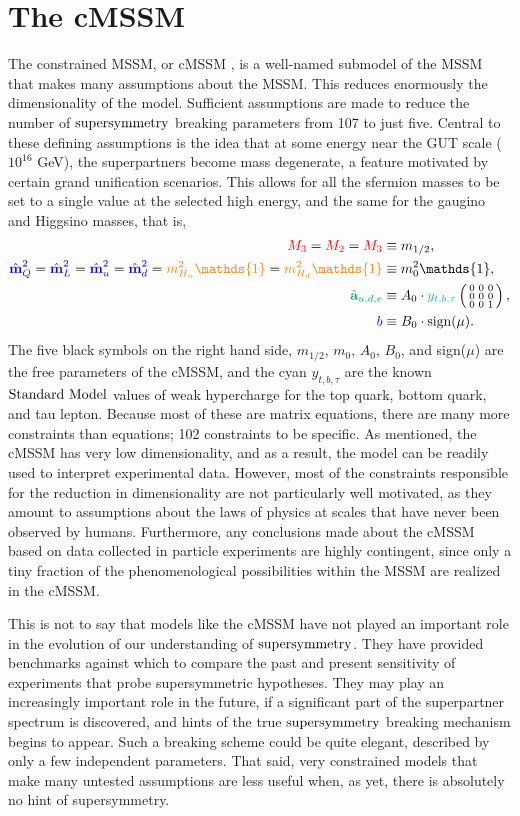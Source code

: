 \section{The cMSSM}
The constrained MSSM, or cMSSM \cite{Wess:1984jr}, is a well-named submodel of the MSSM that makes many assumptions about the MSSM. This reduces enormously the dimensionality of the model. Sufficient assumptions are made to reduce the number of $\text{supersymmetry}$ breaking parameters from 107 to just five. Central to these defining assumptions is the idea that at some energy near the GUT scale ($10^{16}$ GeV), the superpartners become mass degenerate, a feature motivated by certain grand unification scenarios. This allows for all the sfermion masses to be set to a single value at the selected high energy, and the same for the gaugino and Higgsino masses, that is,
\begin{align}
{\color{red}M_3}={\color{red}M_2}={\color{red}M_3} & \equiv m_{1/2},\\
{\color{blue}\hat{\textbf{m}}_Q^2}={\color{blue}\hat{\textbf{m}}_L^2}={\color{blue}\hat{\textbf{m}}_u^2}={\color{blue}\hat{\textbf{m}}_d^2} ={\color{orange}m_{H_u}^2\mathds{1}}={\color{orange}m_{H_d}^2\mathds{1}}& \equiv m_0^2\mathds{1},\\
{\color{Green}\hat{\textbf{a}}_{u,d,e}} & \equiv A_0\cdot{\color{cyan}y_{t,b,\tau}} \eightZeroMat,\\
{\color{blue}b} & \equiv B_0\cdot \text{sign}(\mu).
\end{align}
The five black symbols on the right hand side, $m_{1/2}$, $m_0$, $A_0$, $B_0$, and sign($\mu$) are the
free parameters of the cMSSM, and the cyan $y_{t,b,\tau}$ are the known $\text{Standard\ Model}$ values of weak hypercharge for the top quark, bottom quark, and tau lepton. Because most of these are matrix equations, there are many more constraints than equations; 102 constraints to be specific. As mentioned, the cMSSM has very low dimensionality, and as a result, the model can be readily used to interpret experimental data. However, most of the constraints responsible for the reduction in dimensionality are not particularly well motivated, as they amount to assumptions about the laws of physics at scales that have never been observed by humans. Furthermore, any conclusions made about the cMSSM based on data collected in particle experiments are highly contingent, since only a tiny fraction of the phenomenological possibilities within the MSSM are realized in the cMSSM.

This is not to say that models like the cMSSM have not played an important role in the evolution of our understanding of $\text{supersymmetry}$. They have provided benchmarks against which to compare the past and present sensitivity of experiments that probe supersymmetric hypotheses. They may play an increasingly important role in the future, if a significant part of the superpartner spectrum is discovered, and hints of the true $\text{supersymmetry}$ breaking mechanism begins to appear. Such a breaking scheme could be quite elegant, described by only a few independent parameters. That said, very constrained models that make many untested assumptions are less useful when, as yet, there is absolutely no hint of supersymmetry.

